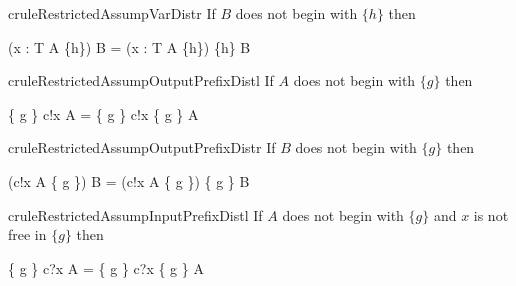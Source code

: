 \begin{minipage}{\textwidth}
\begin{restatable}{crule}{RestrictedAssumpVarDistr}
  \label{restricted-assump-var-distr-rule}
  If $B$ does not begin with $\{h\}$ then
  \begin{circus}
    (\circvar x : T \circspot A \circseq \{h\}) \circseq B
    =
    (\circvar x : T \circspot A \circseq \{h\}) \circseq \{h\} \circseq B
  \end{circus}
\end{restatable}
\end{minipage}

\begin{minipage}{\textwidth}
\begin{restatable}{crule}{RestrictedAssumpOutputPrefixDistl}
  \label{restricted-assump-output-prefix-distl-rule}
  If $A$ does not begin with $\{g\}$  then
  \begin{circus}
    \{ g \} \circseq c!x \then A = \{ g \} \circseq c!x \then \{ g \} \circseq A
  \end{circus}
\end{restatable}
\end{minipage}

\begin{minipage}{\textwidth}
\begin{restatable}{crule}{RestrictedAssumpOutputPrefixDistr}
  \label{restricted-assump-output-prefix-distr-rule}
  If $B$ does not begin with $\{g\}$ then
  \begin{circus}
    (c!x \then A \circseq \{ g \}) \circseq B
    =
    (c!x \then A \circseq \{ g \}) \circseq \{ g \} \circseq B
  \end{circus}
\end{restatable}
\end{minipage}

\begin{minipage}{\textwidth}
\begin{restatable}{crule}{RestrictedAssumpInputPrefixDistl}
  \label{restricted-assump-input-prefix-distl-rule}
  If $A$ does not begin with $\{g\}$ and $x$ is not free in $\{g\}$
  then
  \begin{circus}
    \{ g \} \circseq c?x \then A
    =
    \{ g \} \circseq c?x \then \{ g \} \circseq A
  \end{circus}
\end{restatable}
\end{minipage}

